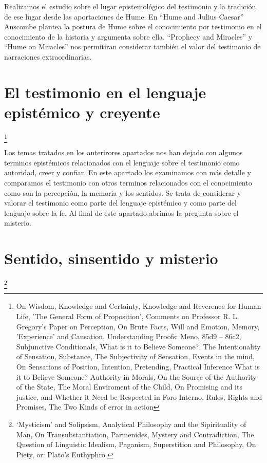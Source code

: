 \documentclass[../main.tex]{subfiles}
\begin{document}
Realizamos el estudio sobre el lugar epistemológico del testimonio y la tradición de ese lugar desde las aportaciones de Hume. En ``Hume and Julius Caesar'' Anscombe plantea la postura de Hume sobre el conocimiento por testimonio en el conocimiento de la historia y argumenta sobre ella. ``Prophecy and Miracles'' y ``Hume on Miracles'' nos permitiran considerar también el valor del testimonio de narraciones extraordinarias. 

\section{El testimonio en el lenguaje epistémico y creyente}
\footnote{
On Wisdom, 
Knowledge and Certainty, 
Knowledge and Reverence for Human Life, 
'The General Form of Proposition', 
Comments on Professor R. L. Gregory's Paper on Perception, 
On Brute Facts, 
Will and Emotion, 
Memory, 'Experience' and Causation, 
Understanding Proofs: Meno, 85d9 – 86c2, 
Subjunctive Conditionals, 
What is it to Believe Someone?, 
The Intentionality of Sensation, 
Substance, 
The Subjectivity of Sensation, 
Events in the mind, 
On Sensations of Position, 
Intention, 
Pretending, 
Practical Inference
What is it to Believe Someone?
Authority in Morals, 
On the Source of the Authority of the State, 
The Moral Enviroment of the Child, 
On Promising and its justice, and Whether it Need be Respected in Foro Interno, 
Rules, Rights and Promises, 
The Two Kinds of error in action
}

Los temas tratados en los anterirores apartados nos han dejado con algunos terminos epistémicos relacionados con el lenguaje sobre el testimonio como autoridad, creer y confiar. En este apartado los examinamos con más detalle y comparamos el testimonio con otros terminos relacionados con el conocimiento como son la percepción, la memoria y los sentidos. Se trata de considerar y valorar el testimonio como parte del lenguaje epistémico y como parte del lenguaje sobre la fe. Al final de este apartado abrimos la pregunta sobre el misterio.

\section{Sentido, sinsentido y misterio}
\footnote{
`Mysticism' and Solipsism, 
Analytical Philosophy and the Sipirituality of Man, 
On Transubstantiation, 
Parmenides, Mystery and Contradiction, 
The Question of Linguistic Idealism, 
Paganism, Superstition and Philosophy, 
On Piety, or: Plato's Euthyphro.
}
\end{document}
